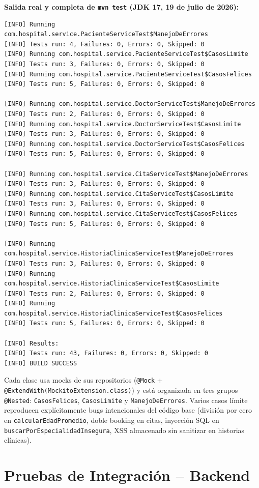 \documentclass[11pt,a4paper]{article}
\begin{document}
\textbf{Salida real y completa de \texttt{mvn test} (JDK 17, 19 de julio de 2026):}
\begin{lstlisting}
[INFO] Running com.hospital.service.PacienteServiceTest$ManejoDeErrores
[INFO] Tests run: 4, Failures: 0, Errors: 0, Skipped: 0
[INFO] Running com.hospital.service.PacienteServiceTest$CasosLimite
[INFO] Tests run: 3, Failures: 0, Errors: 0, Skipped: 0
[INFO] Running com.hospital.service.PacienteServiceTest$CasosFelices
[INFO] Tests run: 5, Failures: 0, Errors: 0, Skipped: 0

[INFO] Running com.hospital.service.DoctorServiceTest$ManejoDeErrores
[INFO] Tests run: 2, Failures: 0, Errors: 0, Skipped: 0
[INFO] Running com.hospital.service.DoctorServiceTest$CasosLimite
[INFO] Tests run: 3, Failures: 0, Errors: 0, Skipped: 0
[INFO] Running com.hospital.service.DoctorServiceTest$CasosFelices
[INFO] Tests run: 5, Failures: 0, Errors: 0, Skipped: 0

[INFO] Running com.hospital.service.CitaServiceTest$ManejoDeErrores
[INFO] Tests run: 3, Failures: 0, Errors: 0, Skipped: 0
[INFO] Running com.hospital.service.CitaServiceTest$CasosLimite
[INFO] Tests run: 3, Failures: 0, Errors: 0, Skipped: 0
[INFO] Running com.hospital.service.CitaServiceTest$CasosFelices
[INFO] Tests run: 5, Failures: 0, Errors: 0, Skipped: 0

[INFO] Running com.hospital.service.HistoriaClinicaServiceTest$ManejoDeErrores
[INFO] Tests run: 3, Failures: 0, Errors: 0, Skipped: 0
[INFO] Running com.hospital.service.HistoriaClinicaServiceTest$CasosLimite
[INFO] Tests run: 2, Failures: 0, Errors: 0, Skipped: 0
[INFO] Running com.hospital.service.HistoriaClinicaServiceTest$CasosFelices
[INFO] Tests run: 5, Failures: 0, Errors: 0, Skipped: 0

[INFO] Results:
[INFO] Tests run: 43, Failures: 0, Errors: 0, Skipped: 0
[INFO] BUILD SUCCESS
\end{lstlisting}

Cada clase usa mocks de sus repositorios (\texttt{@Mock} +
\texttt{@ExtendWith(MockitoExtension.class)}) y est\'a organizada en tres
grupos \texttt{@Nested}: \texttt{CasosFelices}, \texttt{CasosLimite} y
\texttt{ManejoDeErrores}. Varios casos l\'imite reproducen expl\'icitamente
bugs intencionales del c\'odigo base (divisi\'on por cero en
\texttt{calcularEdadPromedio}, doble booking en citas, inyecci\'on SQL en
\texttt{buscarPorEspecialidadInsegura}, XSS almacenado sin sanitizar en
historias cl\'inicas).

\section{Pruebas de Integraci\'on -- Backend}
\end{document}
